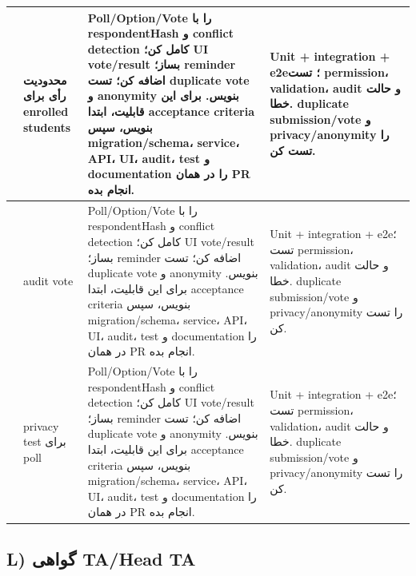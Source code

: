 \documentclass[11pt,a4paper]{article}
\begin{document}
\begin{longtable}{|>{\raggedleft\arraybackslash}p{}|>{\raggedleft\arraybackslash}p{}|>{\raggedleft\arraybackslash}p{}|>{\raggedleft\arraybackslash}p{}|}
198 & محدودیت رأی برای enrolled students & Poll/Option/Vote را با respondentHash و conflict detection کامل کن؛ UI vote/result بساز؛ reminder اضافه کن؛ تست duplicate vote و anonymity بنویس. برای این قابلیت، ابتدا acceptance criteria بنویس، سپس migration/schema، service، API، UI، audit، test و documentation را در همان PR انجام بده. & Unit + integration + e2e؛ تست permission، validation، audit و حالت خطا. duplicate submission/vote و privacy/anonymity را تست کن. \\ \hline
199 & audit vote & Poll/Option/Vote را با respondentHash و conflict detection کامل کن؛ UI vote/result بساز؛ reminder اضافه کن؛ تست duplicate vote و anonymity بنویس. برای این قابلیت، ابتدا acceptance criteria بنویس، سپس migration/schema، service، API، UI، audit، test و documentation را در همان PR انجام بده. & Unit + integration + e2e؛ تست permission، validation، audit و حالت خطا. duplicate submission/vote و privacy/anonymity را تست کن. \\ \hline
200 & privacy test برای poll & Poll/Option/Vote را با respondentHash و conflict detection کامل کن؛ UI vote/result بساز؛ reminder اضافه کن؛ تست duplicate vote و anonymity بنویس. برای این قابلیت، ابتدا acceptance criteria بنویس، سپس migration/schema، service، API، UI، audit، test و documentation را در همان PR انجام بده. & Unit + integration + e2e؛ تست permission، validation، audit و حالت خطا. duplicate submission/vote و privacy/anonymity را تست کن. \\ \hline
\end{longtable}
\subsection{L) گواهی TA/Head TA}
\end{document}
